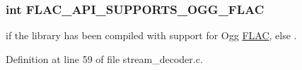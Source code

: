 \subsubsection[{\texorpdfstring{F\+L\+A\+C\+\_\+\+A\+P\+I\+\_\+\+S\+U\+P\+P\+O\+R\+T\+S\+\_\+\+O\+G\+G\+\_\+\+F\+L\+AC}{FLAC_API_SUPPORTS_OGG_FLAC}}]{ {\bf int} F\+L\+A\+C\+\_\+\+A\+P\+I\+\_\+\+S\+U\+P\+P\+O\+R\+T\+S\+\_\+\+O\+G\+G\+\_\+\+F\+L\+AC}\hypertarget{group__flac__export_gaf762876dd61fbf2da1bef49762900533}{}\label{group__flac__export_gaf762876dd61fbf2da1bef49762900533}
{} if the library has been compiled with support for Ogg \hyperlink{namespace_f_l_a_c}{F\+L\+AC}, else {}. 

Definition at line 59 of file stream\+\_\+decoder.\+c.

